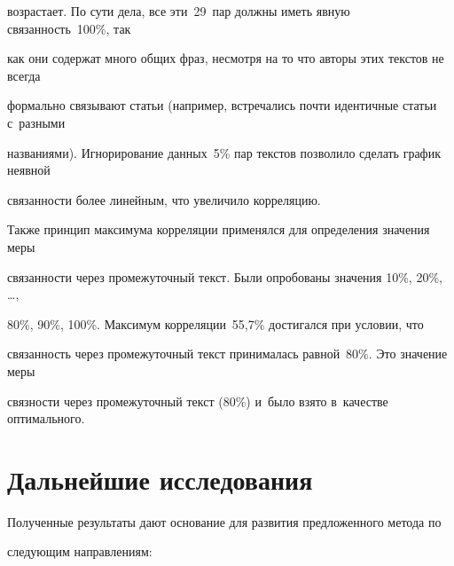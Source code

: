 возрастает. По сути дела, все эти~29~пар должны иметь явную связанность~100\%, так 

как они содержат много общих фраз, несмотря на то что авторы этих текстов не всегда 

формально связывают статьи (например, встречались почти идентичные статьи с~разными 

названиями). Игнорирование данных~5\% пар текстов позволило сделать график неявной 

связанности более линейным, что увеличило корреляцию.

     

     Также принцип максимума корреляции применялся для определения значения меры 

связанности через промежуточный текст. Были опробованы значения 10\%, 20\%, \ldots , 

80\%, 90\%, 100\%. Максимум корреляции~55,7\% достигался при условии, что 

связанность через промежуточный текст принималась равной~80\%. Это значение меры 

связности через промежуточный текст (80\%) и~было взято в~качестве оптимального.



\vspace*{-3pt}



\section{Дальнейшие исследования}



\vspace*{-3pt}



     Полученные результаты дают основание для развития предложенного метода по 

следующим направлениям:

